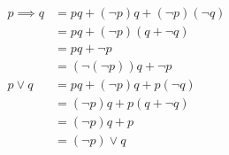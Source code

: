 \documentclass{article}
\begin{document}
	\begin{align}
	p \implies q & = pq + (\neg p)q + (\neg p)(\neg q) \\
	& = pq + (\neg p)(q + \neg q) \\
	& = pq + \neg p \\
	& = (\neg (\neg p))q + \neg p \\
	p \lor q & = pq + (\neg p)q + p(\neg q) \\
	& = (\neg p)q + p(q + \neg q) \\
	& = (\neg p)q + p \\
	& = (\neg p) \lor q
	\end{align}
\end{document}
